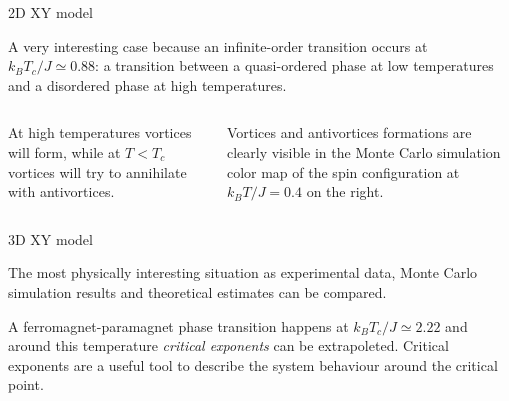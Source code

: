 \documentclass{beamer}
\begin{document}
\begin{frame}{2D XY model}

A very interesting case because an infinite-order transition occurs at $k_B T_c /
J \simeq 0.88$: a transition between a quasi-ordered phase at low temperatures and
a disordered phase at high temperatures.

\begin{columns}

At high temperatures vortices will form, while at $T < T_c$ vortices will try to
annihilate with antivortices. 

\vspace{2mm}

Vortices and antivortices formations are clearly visible in the Monte Carlo
simulation color map of the spin configuration at $k_B T / J = 0.4$ on the right. 


\end{columns}
\end{frame}


\begin{frame}{3D XY model}

The most physically interesting situation as experimental data, Monte Carlo
simulation results and theoretical estimates can be compared.

\vspace{5mm}

A ferromagnet-paramagnet phase transition happens at $k_B T_c / J \simeq 2.22$ and 
around this temperature \emph{critical exponents} can be extrapoleted. Critical
exponents are a useful tool to describe the system behaviour around the critical
point.

\end{frame}
\end{document}
